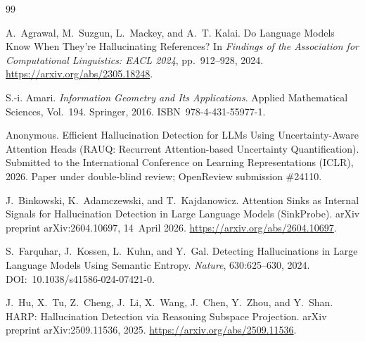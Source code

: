 \documentclass[10pt, letterpaper]{article}
\begin{document}
\begin{thebibliography}{99}

A.~Agrawal, M.~Suzgun, L.~Mackey, and A.~T. Kalai.
\newblock Do Language Models Know When They're Hallucinating
References?
\newblock In \emph{Findings of the Association for Computational
Linguistics: EACL 2024}, pp.~912--928, 2024.
\newblock \url{https://arxiv.org/abs/2305.18248}.

S.-i. Amari.
\newblock \emph{Information Geometry and Its Applications}.
\newblock Applied Mathematical Sciences, Vol.~194. Springer, 2016.
\newblock \mbox{ISBN 978-4-431-55977-1}.

Anonymous.
\newblock Efficient Hallucination Detection for LLMs Using
Uncertainty-Aware Attention Heads (RAUQ: Recurrent
Attention-based Uncertainty Quantification).
\newblock Submitted to the International Conference on Learning
Representations (ICLR), 2026.
\newblock Paper under double-blind review; OpenReview submission
\#24110.

J.~Binkowski, K.~Adamczewski, and T.~Kajdanowicz.
\newblock Attention Sinks as Internal Signals for Hallucination
Detection in Large Language Models (SinkProbe).
\newblock arXiv preprint arXiv:2604.10697, 14~April 2026.
\newblock \url{https://arxiv.org/abs/2604.10697}.

S.~Farquhar, J.~Kossen, L.~Kuhn, and Y.~Gal.
\newblock Detecting Hallucinations in Large Language Models Using
Semantic Entropy.
\newblock \emph{Nature}, 630:625--630, 2024.
\newblock \mbox{DOI: 10.1038/s41586-024-07421-0}.

J.~Hu, X.~Tu, Z.~Cheng, J.~Li, X.~Wang, J.~Chen, Y.~Zhou, and Y.~Shan.
\newblock HARP: Hallucination Detection via Reasoning Subspace
Projection.
\newblock arXiv preprint arXiv:2509.11536, 2025.
\newblock \url{https://arxiv.org/abs/2509.11536}.


\end{thebibliography}
\end{document}
